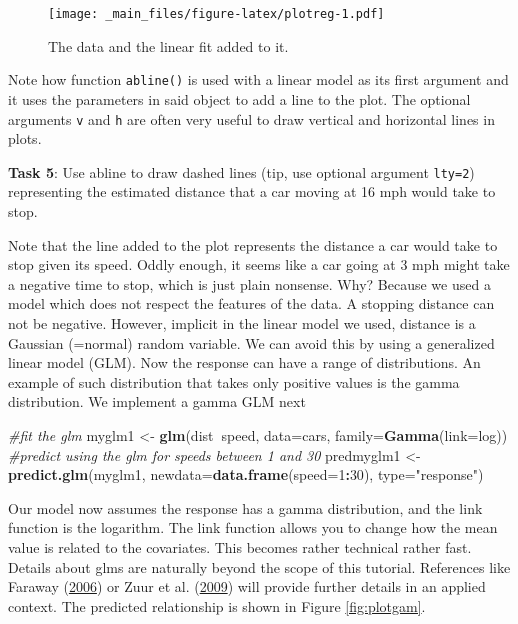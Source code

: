 \documentclass[]{book}
\newenvironment{Shaded}{\begin{snugshade}}{\end{snugshade}}
\newcommand{\KeywordTok}[1]{\textcolor[rgb]{0.13,0.29,0.53}{\textbf{#1}}}
\newcommand{\DataTypeTok}[1]{\textcolor[rgb]{0.13,0.29,0.53}{#1}}
\newcommand{\DecValTok}[1]{\textcolor[rgb]{0.00,0.00,0.81}{#1}}
\newcommand{\StringTok}[1]{\textcolor[rgb]{0.31,0.60,0.02}{#1}}
\newcommand{\CommentTok}[1]{\textcolor[rgb]{0.56,0.35,0.01}{\textit{#1}}}
\newcommand{\OperatorTok}[1]{\textcolor[rgb]{0.81,0.36,0.00}{\textbf{#1}}}
\newcommand{\NormalTok}[1]{#1}
\theoremstyle{definition}
\theoremstyle{definition}
\theoremstyle{remark}
\begin{document}
\begin{figure}
\centering
\texttt{[image: \_main\_files/figure-latex/plotreg-1.pdf]}
\caption{\label{fig:plotreg}The data and the linear fit added to it.}
\end{figure}

Note how function \texttt{abline()} is used with a linear model as its
first argument and it uses the parameters in said object to add a line
to the plot. The optional arguments \texttt{v} and \texttt{h} are often
very useful to draw vertical and horizontal lines in plots.

\textbf{Task 5}: Use abline to draw dashed lines (tip, use optional
argument \texttt{lty=2}) representing the estimated distance that a car
moving at 16 mph would take to stop.

Note that the line added to the plot represents the distance a car would
take to stop given its speed. Oddly enough, it seems like a car going at
3 mph might take a negative time to stop, which is just plain nonsense.
Why? Because we used a model which does not respect the features of the
data. A stopping distance can not be negative. However, implicit in the
linear model we used, distance is a Gaussian (=normal) random variable.
We can avoid this by using a generalized linear model (GLM). Now the
response can have a range of distributions. An example of such
distribution that takes only positive values is the gamma distribution.
We implement a gamma GLM next

\begin{Shaded}
\begin{Highlighting}[]
\CommentTok{#fit the glm}
\NormalTok{myglm1 <-}\StringTok{ }\KeywordTok{glm}\NormalTok{(dist}\OperatorTok{~}\NormalTok{speed, }\DataTypeTok{data=}\NormalTok{cars, }\DataTypeTok{family=}\KeywordTok{Gamma}\NormalTok{(}\DataTypeTok{link=}\NormalTok{log))}
\CommentTok{#predict using the glm for speeds between 1 and 30}
\NormalTok{predmyglm1 <-}\StringTok{ }\KeywordTok{predict.glm}\NormalTok{(myglm1, }\DataTypeTok{newdata=}\KeywordTok{data.frame}\NormalTok{(}\DataTypeTok{speed=}\DecValTok{1}\OperatorTok{:}\DecValTok{30}\NormalTok{), }
                          \DataTypeTok{type=}\StringTok{"response"}\NormalTok{)}
\end{Highlighting}
\end{Shaded}

Our model now assumes the response has a gamma distribution, and the
link function is the logarithm. The link function allows you to change
how the mean value is related to the covariates. This becomes rather
technical rather fast. Details about glms are naturally beyond the scope
of this tutorial. References like Faraway
(\protect\hyperlink{ref-Faraway2006}{2006}) or Zuur et al.
(\protect\hyperlink{ref-Zuur2009b}{2009}) will provide further details
in an applied context. The predicted relationship is shown in Figure
\ref{fig:plotgam}.
\end{document}
